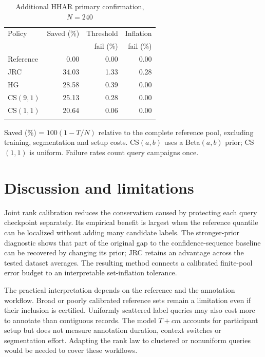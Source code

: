 \documentclass[pdflatex,sn-basic,Numbered,iicol]{sn-jnl}
\begin{document}
\begin{table}[t]
\centering\small\setlength{\tabcolsep}{2pt}
\caption{Additional HHAR primary confirmation, $N=240$}\label{tab:hhar}
\begin{tabular}{lrrr}
\toprule
Policy & Saved (\%) & Threshold & Inflation \\
 & & fail (\%) & fail (\%) \\
\midrule
Reference & 0.00 & 0.00 & 0.00 \\
JRC & 34.03 & 1.33 & 0.28 \\
HG & 28.58 & 0.39 & 0.00 \\
CS$(9,1)$ & 25.13 & 0.28 & 0.00 \\
CS$(1,1)$ & 20.64 & 0.06 & 0.00 \\
\botrule
\end{tabular}
\par\vspace{3pt}\raggedright\footnotesize Saved (\%) = $100(1-T/N)$ relative to the complete reference pool, excluding training, segmentation and setup costs. CS$(a,b)$ uses a Beta$(a,b)$ prior; CS$(1,1)$ is uniform. Failure rates count query campaigns once.\par
\end{table}

\section{Discussion and limitations}
Joint rank calibration reduces the conservatism caused by protecting each query checkpoint separately. Its empirical benefit is largest when the reference quantile can be localized without adding many candidate labels. The stronger-prior diagnostic shows that part of the original gap to the confidence-sequence baseline can be recovered by changing its prior; JRC retains an advantage across the tested dataset averages. The resulting method connects a calibrated finite-pool error budget to an interpretable set-inflation tolerance.

The practical interpretation depends on the reference and the annotation workflow. Broad or poorly calibrated reference sets remain a limitation even if their inclusion is certified. Uniformly scattered label queries may also cost more to annotate than contiguous records. The model $T+cm$ accounts for participant setup but does not measure annotation duration, context switches or segmentation effort. Adapting the rank law to clustered or nonuniform queries would be needed to cover these workflows.
\end{document}
